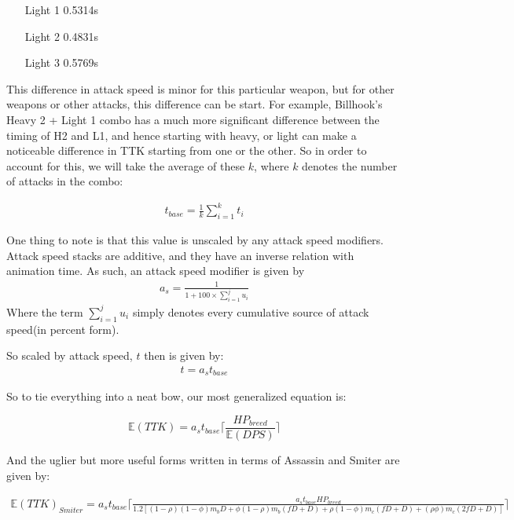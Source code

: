 \documentclass{article}
\begin{document}
\begin{enumerate}
\item[Light 1] 0.5314s
\item[Light 2] 0.4831s
\item[Light 3] 0.5769s
\end{enumerate}

This difference in attack speed is minor for this particular weapon, but for other weapons or other attacks, this difference can be start. For example, Billhook's Heavy 2 + Light 1 combo has a much more significant difference between the timing of H2 and L1, and hence starting with heavy, or light can make a noticeable difference in TTK starting from one or the other. So in order to account for this, we will take the average of these $k$, where $k$ denotes the number of attacks in the combo:

\begin{align*}
t_{base} = \frac{1}{k} \sum_{i=1}^{k} t_i
\end{align*}

One thing to note is that this value is unscaled by any attack speed modifiers. Attack speed stacks are additive, and they have an inverse relation with animation time. As such, an attack speed modifier is given by
\begin{align*}
a_s = \frac{1}{1+100\times\sum_{i=1}^{j} u_i}
\end{align*}
Where the term $\sum_{i=1}^{j} u_i$ simply denotes every cumulative source of attack speed(in percent form).

So scaled by attack speed, $t$ then is given by:
\begin{align*}
t = a_s t_{base}
\end{align*}

So to tie everything into a neat bow, our most generalized equation is:

\begin{equation}
\boxed{ \mathbb{E}(TTK) = a_s t_{base} \lceil \frac{{HP}_{breed}}{\mathbb{E}(DPS)} \rceil }
\end{equation}

And the uglier but more useful forms written in terms of Assassin and Smiter are given by:

\begin{align*}
 \mathbb{E}(TTK)_{Smiter} = a_s t_{base} \lceil \frac{a_s t_{base}  {HP}_{breed} }{1.2 [(1-\rho) (1-\phi) m_b D + \phi(1-\rho) m_b (fD + D) + \rho(1-\phi) m_c (fD + D) + (\rho \phi) m_c (2fD + D) ]} \rceil
\end{align*}
\end{document}
